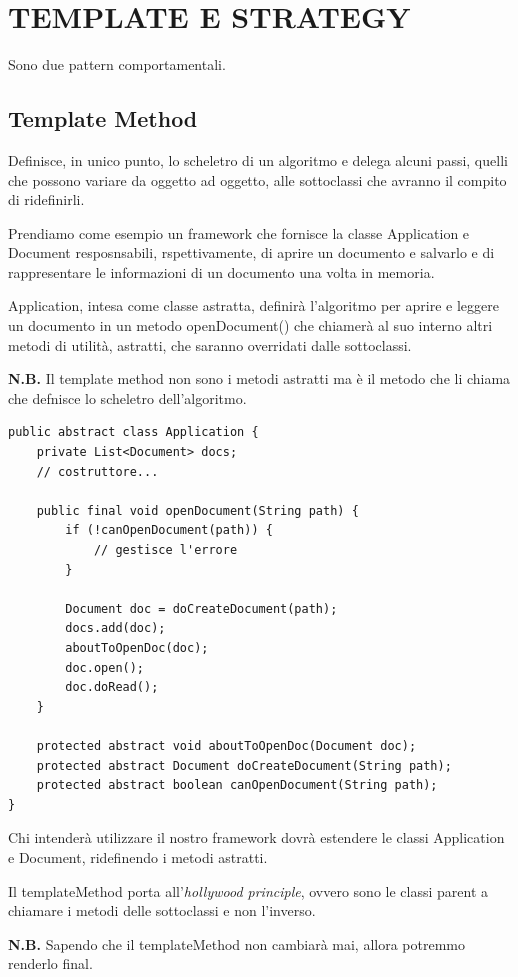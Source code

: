 \chapter{TEMPLATE E STRATEGY}
Sono due pattern comportamentali.

\section{Template Method}
Definisce, in unico punto, lo scheletro di un algoritmo e delega alcuni passi, quelli che possono variare da oggetto ad oggetto, alle sottoclassi che avranno il compito 
di ridefinirli.

Prendiamo come esempio un framework che fornisce la classe Application e Document resposnsabili, rspettivamente, di aprire un documento e salvarlo e di rappresentare le
informazioni di un documento una volta in memoria.

Application, intesa come classe astratta, definirà l’algoritmo per aprire e leggere un documento in un metodo openDocument() che chiamerà al suo interno altri metodi 
di utilità, astratti, che saranno overridati dalle sottoclassi.

\medskip
\textbf{N.B.} Il template method non sono i metodi astratti ma è il metodo che li chiama che defnisce lo scheletro dell'algoritmo.

\begin{lstlisting}
public abstract class Application {
    private List<Document> docs;
    // costruttore...
    
    public final void openDocument(String path) {
        if (!canOpenDocument(path)) {
            // gestisce l'errore
        }

        Document doc = doCreateDocument(path);
        docs.add(doc);
        aboutToOpenDoc(doc);
        doc.open();
        doc.doRead();
    }

    protected abstract void aboutToOpenDoc(Document doc);
    protected abstract Document doCreateDocument(String path);
    protected abstract boolean canOpenDocument(String path);
}
\end{lstlisting}

Chi intenderà utilizzare il nostro framework dovrà estendere le classi Application e Document, ridefinendo i metodi astratti.


Il templateMethod porta all'\textit{hollywood principle}, ovvero sono le classi parent a chiamare i metodi delle sottoclassi e non l'inverso. 

\medskip
\textbf{N.B.} Sapendo che il templateMethod non cambiarà mai, allora potremmo renderlo final.

